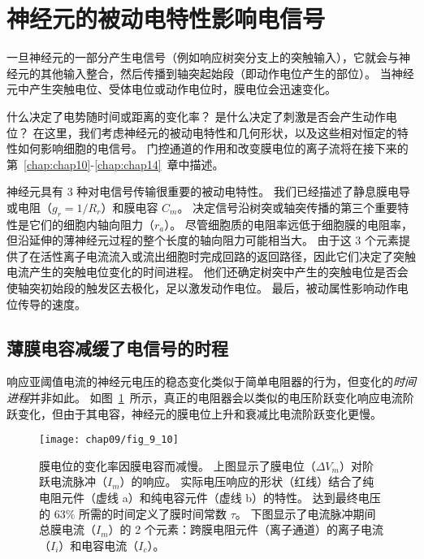 \section{神经元的被动电特性影响电信号}

一旦神经元的一部分产生电信号（例如响应树突分支上的突触输入），它就会与神经元的其他输入整合，然后传播到轴突起始段（即动作电位产生的部位）。
当神经元中产生突触电位、受体电位或动作电位时，膜电位会迅速变化。


什么决定了电势随时间或距离的变化率？
是什么决定了刺激是否会产生动作电位？
在这里，我们考虑神经元的被动电特性和几何形状，以及这些相对恒定的特性如何影响细胞的电信号。 
门控通道的作用和改变膜电位的离子流将在接下来的第~\ref{chap:chap10}-\ref{chap:chap14}~章中描述。


神经元具有 3 种对电信号传输很重要的被动电特性。
我们已经描述了静息膜电导或电阻（$g_r = 1 / R_r$）和膜电容 $C_m$。
决定信号沿树突或轴突传播的第三个重要特性是它们的细胞内轴向阻力（$r_a$）。 
尽管细胞质的电阻率远低于细胞膜的电阻率，但沿延伸的薄神经元过程的整个长度的轴向阻力可能相当大。
由于这 3 个元素提供了在活性离子电流流入或流出细胞时完成回路的返回路径，因此它们决定了突触电流产生的突触电位变化的时间进程。
他们还确定树突中产生的突触电位是否会使轴突初始段的触发区去极化，足以激发动作电位。
最后，被动属性影响动作电位传导的速度。


\subsection{薄膜电容减缓了电信号的时程}

响应亚阈值电流的神经元电压的稳态变化类似于简单电阻器的行为，但变化的\textit{时间进程}并非如此。 
如图~\ref{fig:9_10}~所示，真正的电阻器会以类似的电压阶跃变化响应电流阶跃变化，但由于其电容，神经元的膜电位上升和衰减比电流阶跃变化更慢。


\begin{figure}[htbp]
	\centering
	\texttt{[image: chap09/fig\_9\_10]}
	\caption{膜电位的变化率因膜电容而减慢。
		上图显示了膜电位（$\Delta V_m$）对阶跃电流脉冲（$I_m$）的响应。
		实际电压响应的形状（红线）结合了纯电阻元件（虚线 a）和纯电容元件（虚线 b）的特性。
		达到最终电压的 63\% 所需的时间定义了膜时间常数 $\tau$。
		下图显示了电流脉冲期间总膜电流（$I_m$）的 2 个元素：跨膜电阻元件（离子通道）的离子电流（$I_i$）和电容电流（$I_c$）。}
	\label{fig:9_10}
\end{figure}


